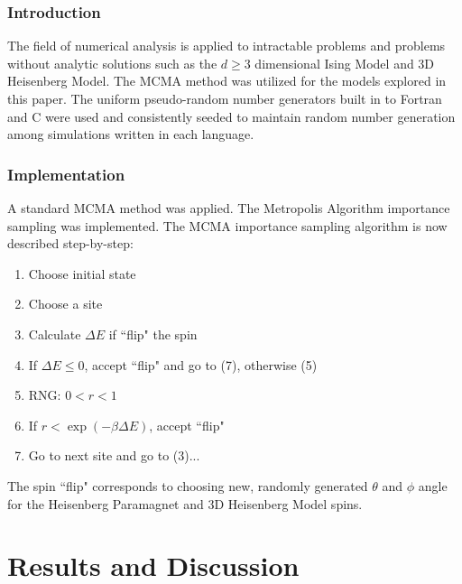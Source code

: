 \documentclass[a4paper,12pt]{article}
\begin{document}
	\subsubsection{Introduction}
	The field of numerical analysis is applied to intractable problems and problems without analytic solutions such as the $d \geq 3$ dimensional Ising Model and 3D Heisenberg Model. The MCMA method was utilized for the models explored in this paper. The uniform pseudo-random number generators built in to Fortran and C were used and consistently seeded to maintain random number generation among simulations written in each language.
	\subsubsection{Implementation}
A standard MCMA method was applied. The Metropolis Algorithm importance sampling was implemented. The MCMA importance sampling algorithm is now described step-by-step:
	\begin{enumerate}
		\item Choose initial state
		\item Choose a site
		\item Calculate $\Delta E$ if ``flip" the spin
		\item If $\Delta E \le 0$, accept ``flip" and go to (7), otherwise (5)
		\item RNG: $0 < r < 1$
		\item If $r < \exp(-\beta \Delta E)$, accept ``flip"
		\item Go to next site and go to (3)...
	\end{enumerate}
The spin ``flip" corresponds to choosing new, randomly generated $\theta$ and $\phi$ angle for the Heisenberg Paramagnet and 3D Heisenberg Model spins. \cite{landau}


\section{Results and Discussion}
\end{document}
